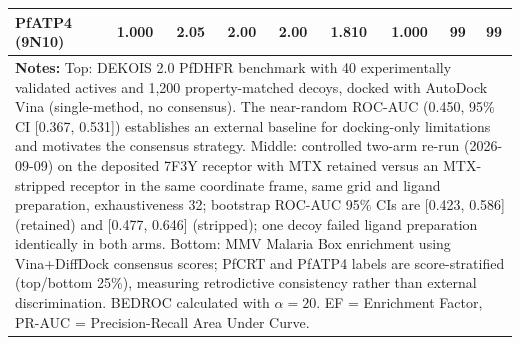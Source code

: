 \begin{table}[!htbp]
\begin{tabular}{lcccccccc}
PfATP4 (9N10) & \num{1.000} & \num{2.05} & \num{2.00} & \num{2.00} & \num{1.810} & \num{1.000} & \num{99} & \num{99} \\
\bottomrule
\multicolumn{9}{p{15cm}}{
\noindent\textbf{Notes:} Top: DEKOIS 2.0 PfDHFR benchmark with 40 experimentally validated actives and 1,200 property-matched decoys, docked with AutoDock Vina (single-method, no consensus). The near-random ROC-AUC (0.450, 95\% CI [0.367, 0.531]) establishes an external baseline for docking-only limitations and motivates the consensus strategy. Middle: controlled two-arm re-run (2026-09-09) on the deposited 7F3Y receptor with MTX retained versus an MTX-stripped receptor in the same coordinate frame, same grid and ligand preparation, exhaustiveness 32; bootstrap ROC-AUC 95\% CIs are [0.423, 0.586] (retained) and [0.477, 0.646] (stripped); one decoy failed ligand preparation identically in both arms. Bottom: MMV Malaria Box enrichment using Vina+DiffDock consensus scores; PfCRT and PfATP4 labels are score-stratified (top/bottom 25\%), measuring retrodictive consistency rather than external discrimination. BEDROC calculated with $\alpha = 20$. EF = Enrichment Factor, PR-AUC = Precision-Recall Area Under Curve.}
\end{tabular}
\end{table}
